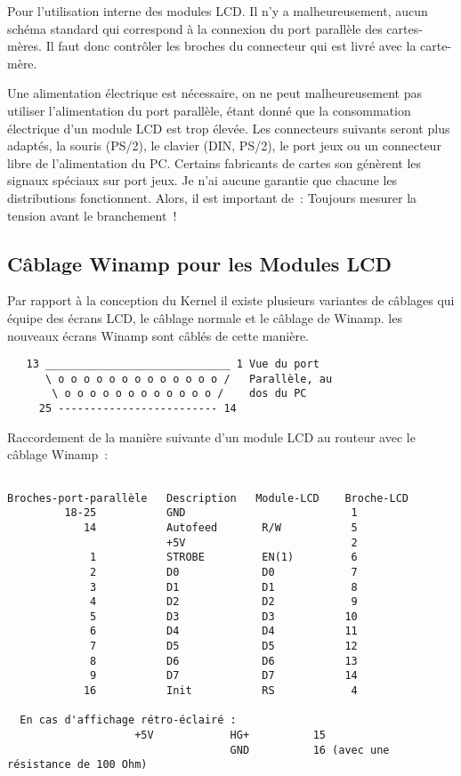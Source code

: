   Pour l'utilisation interne des modules LCD. Il n'y a malheureusement,
  aucun schéma standard qui correspond à la connexion du port parallèle des
  cartes-mères. Il faut donc contrôler les broches du connecteur qui est
  livré avec la carte-mère.

  Une alimentation électrique est nécessaire, on ne peut malheureusement pas
  utiliser l'alimentation du port parallèle, étant donné que la consommation
  électrique d'un module LCD est trop élevée. Les connecteurs suivants seront
  plus adaptés, la souris (PS/2), le clavier (DIN, PS/2), le port jeux ou un
  connecteur libre de l'alimentation du PC. Certains fabricants de cartes
  son génèrent les signaux spéciaux sur port jeux. Je n'ai aucune garantie
  que chacune les distributions fonctionnent. Alors, il est important de~:
  Toujours mesurer la tension avant le branchement~!

\subsection{Câblage Winamp pour les Modules LCD}

  Par rapport à la conception du Kernel il existe plusieurs variantes de câblages
  qui équipe des écrans LCD, le câblage normale et le câblage de Winamp. les
  nouveaux écrans Winamp sont câblés de cette manière.

\begin{example}
\begin{verbatim}
   13 _____________________________ 1 Vue du port
      \ o o o o o o o o o o o o o /   Parallèle, au
       \ o o o o o o o o o o o o /    dos du PC
     25 ------------------------- 14
\end{verbatim}
\end{example}

 Raccordement de la manière suivante d'un module LCD au routeur avec
 le câblage Winamp~:

\begin{example}
\begin{verbatim}

Broches-port-parallèle   Description   Module-LCD    Broche-LCD
         18-25           GND                          1
            14           Autofeed       R/W           5
                         +5V                          2
             1           STROBE         EN(1)         6
             2           D0             D0            7
             3           D1             D1            8
             4           D2             D2            9
             5           D3             D3           10
             6           D4             D4           11
             7           D5             D5           12
             8           D6             D6           13
             9           D7             D7           14
            16           Init           RS            4

  En cas d'affichage rétro-éclairé :
                    +5V            HG+          15
                                   GND          16 (avec une résistance de 100 Ohm)
\end{verbatim}
\end{example}

